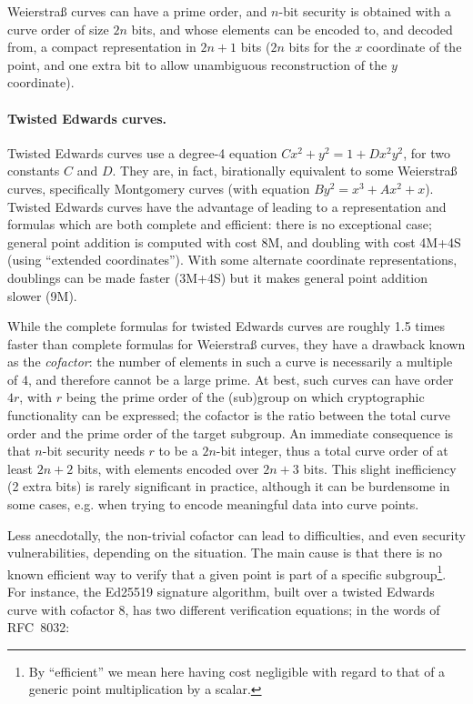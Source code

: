 \documentclass{llncs}
\begin{document}
Weierstraß curves can have a prime order, and $n$-bit security is
obtained with a curve order of size $2n$ bits, and whose elements can be
encoded to, and decoded from, a compact representation in $2n+1$ bits
($2n$ bits for the $x$ coordinate of the point, and one extra bit to
allow unambiguous reconstruction of the $y$ coordinate).

\paragraph{Twisted Edwards curves.} Twisted Edwards
curves\cite{BerBirJoyLanPet2008} use a degree-4 equation $Cx^2 + y^2 = 1
+ Dx^2 y^2$, for two constants $C$ and $D$. They are, in fact,
birationally equivalent to some Weierstraß curves, specifically
Montgomery curves (with equation $By^2 = x^3 + Ax^2 + x$). Twisted
Edwards curves have the advantage of leading to a representation and
formulas which are both complete and efficient: there is no exceptional
case; general point addition is computed with cost 8M, and doubling with
cost 4M+4S (using ``extended coordinates''\cite{HisWonCarDaw2008}). With
some alternate coordinate representations, doublings can be made faster
(3M+4S) but it makes general point addition slower (9M).

While the complete formulas for twisted Edwards curves are roughly 1.5
times faster than complete formulas for Weierstraß curves, they have a
drawback known as the \emph{cofactor}: the number of elements in such a
curve is necessarily a multiple of 4, and therefore cannot be a large
prime. At best, such curves can have order $4r$, with $r$ being the
prime order of the (sub)group on which cryptographic functionality can
be expressed; the cofactor is the ratio between the total curve order
and the prime order of the target subgroup. An immediate consequence is
that $n$-bit security needs $r$ to be a $2n$-bit integer, thus a total
curve order of at least $2n+2$ bits, with elements encoded over $2n+3$
bits. This slight inefficiency (2 extra bits) is rarely significant in
practice, although it can be burdensome in some cases, e.g. when trying
to encode meaningful data into curve points.

Less anecdotally, the non-trivial cofactor can lead to difficulties,
and even security vulnerabilities, depending on the situation. The main
cause is that there is no known efficient way to verify that a given
point is part of a specific subgroup\footnote{By ``efficient'' we mean
here having cost negligible with regard to that of a generic point
multiplication by a scalar.}. For instance, the Ed25519 signature
algorithm, built over a twisted Edwards curve with cofactor 8, has two
different verification equations; in the words of
RFC~8032\cite{EdDSArfc8032}:
\end{document}
